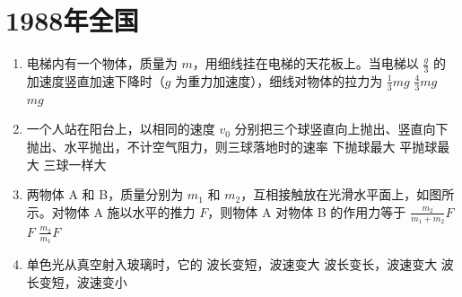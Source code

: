 \documentclass[\gkver]{gaokaozhenti}
\begin{document}
\chapter{1988年全国}

\begin{enumerate}
\item
电梯内有一个物体，质量为 $m$，用细线挂在电梯的天花板上。当电梯以 $\frac{g}{3}$ 的加速度竖直加速下降时（$g$ 为重力加速度），细线对物体的拉力为
{$\frac{1}{3}mg$}
{$\frac{4}{3}mg$}
{$mg$}


\item
一个人站在阳台上，以相同的速度 $v_{0}$ 分别把三个球竖直向上抛出、竖直向下抛出、水平抛出，不计空气阻力，则三球落地时的速率
{下抛球最大}
{平抛球最大}
{三球一样大}


\item
两物体 A 和 B，质量分别为 $m_{1}$ 和 $m_{2}$，互相接触放在光滑水平面上，如图所示。对物体 A 施以水平的推力 $F$，则物体 A 对物体 B 的作用力等于
\onepicture{}
{$\frac{m_{2}}{m_{1}+m_{2}}F$}
{$F$}
{$\frac{m_{2}}{m_{1}}F$}


\item
单色光从真空射入玻璃时，它的
{波长变短，波速变大}
{波长变长，波速变大}
{波长变短，波速变小}


\end{enumerate}
\end{document}
